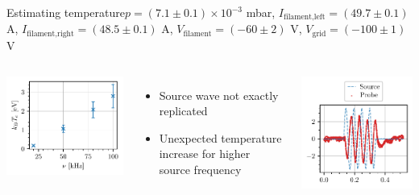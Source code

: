 \documentclass[10pt]{beamer}
\begin{document}
\begin{frame}{Estimating temperature}{$p = (7.1 \pm 0.1) \times 10^{-3}$ mbar, $I_\text{filament,left} = (49.7 \pm 0.1)$ A, $I_\text{filament,right} = (48.5 \pm 0.1)$ A, $V_\text{filament} = (-60 \pm 2)$ V, $V_\text{grid} = (-100 \pm 1)$ V}
    \begin{columns}
        \centering
        \includegraphics[scale=1]{../figures/ion_acoustic_temperature.pdf}
        \begin{itemize}
            \item Source wave not exactly replicated
            \item Unexpected temperature increase for higher source frequency
        \end{itemize}
        
        \centering
        \includegraphics[scale=1]{../figures/ion_acoustic_wave.pdf}
    \end{columns}
\end{frame}
\end{document}
